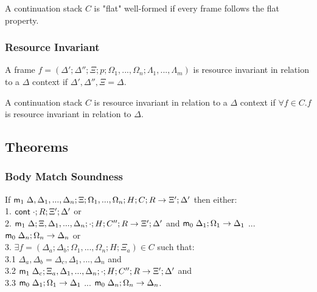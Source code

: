 A continuation stack $C$ is "flat" well-formed if every frame follows the flat property.

\subsubsection{Resource Invariant}

A frame $f = (\Delta'; \Delta''; \Xi; p; \Omega_1, ..., \Omega_n; \Lambda_1, ..., \Lambda_m)$ is resource invariant in relation to a $\Delta$ context if $\Delta', \Delta'', \Xi = \Delta$.

A continuation stack $C$ is resource invariant in relation to a $\Delta$ context if $\forall f \in C. f$ is resource invariant in relation to $\Delta$.

\subsection{Theorems}

\subsubsection{Body Match Soundness}

If $\mathsf{m}_1 \; \Delta, \Delta_1, ..., \Delta_n; \Xi; \Omega_1, ..., \Omega_n; H; C; R \rightarrow \Xi'; \Delta'$ then either:\\
1. \hspace{1cm} $\mathsf{cont} \; \cdot; R; \Xi'; \Delta'$ or \\
2. \hspace{1cm} $\mathsf{m}_1 \; \Delta; \Xi, \Delta_1, ..., \Delta_n; \cdot; H; C''; R \rightarrow \Xi'; \Delta'$ and $\mathsf{m}_0 \; \Delta_1; \Omega_1 \rightarrow \Delta_1$ ... $\mathsf{m}_0 \; \Delta_n; \Omega_n \rightarrow \Delta_n$ or \\
3. \hspace{1cm} $\exists f = (\Delta_a; \Delta_b; \Omega_1, ..., \Omega_n; H; \Xi_a) \in C$ such that:\\
3.1 \hspace{2cm} $\Delta_a, \Delta_b = \Delta_c, \Delta_1, ..., \Delta_n$ and \\
3.2 \hspace{2cm} $\mathsf{m}_1 \; \Delta_c; \Xi_a, \Delta_1, ..., \Delta_n; \cdot; H; C''; R \rightarrow \Xi'; \Delta'$ and \\
3.3 \hspace{2cm} $\mathsf{m}_0 \; \Delta_1; \Omega_1 \rightarrow \Delta_1$ ... $\mathsf{m}_0 \; \Delta_n; \Omega_n \rightarrow \Delta_n$.\\

